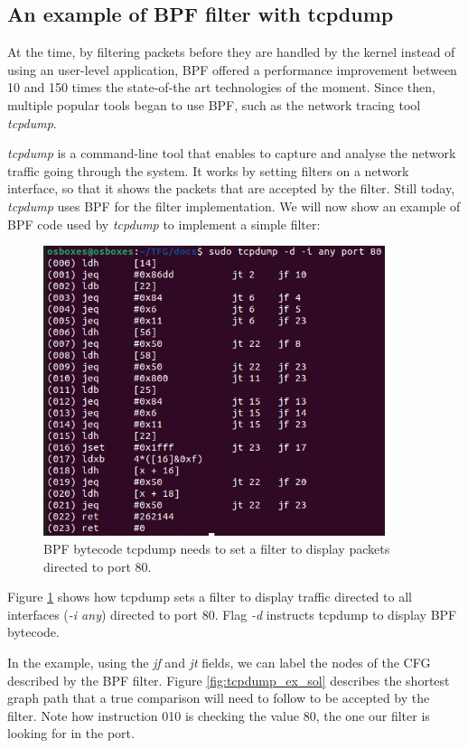 \documentclass[12pt]{report} %
\begin{document}
\subsection{An example of BPF filter with tcpdump}
At the time, by filtering packets before they are handled by the kernel instead of using an user-level application, BPF offered a performance improvement between 10 and 150 times the state-of-the art technologies of the moment\cite{bpf_bsd_origin_bpf_page1}. Since then, multiple popular tools began to use BPF, such as the network tracing tool \textit{tcpdump}\cite{tcpdump_page}.

\textit{tcpdump} is a command-line tool that enables to capture and analyse the network traffic going through the system. It works by setting filters on a network interface, so that it shows the packets that are accepted by the filter. Still today, \textit{tcpdump} uses BPF for the filter implementation. We will now show an example of BPF code used by \textit{tcpdump} to implement a simple filter:

\begin{figure}[H]
	\centering
	\includegraphics[width=10cm]{tcpdump_example.png}
	\caption{BPF bytecode tcpdump needs to set a filter to display packets directed to port 80.}
	\label{fig:bpf_tcpdump_example}
\end{figure}

Figure \ref{fig:bpf_tcpdump_example} shows how tcpdump sets a filter to display traffic directed to all interfaces (\textit{-i any}) directed to port 80. Flag \textit{-d} instructs tcpdump to display BPF bytecode.

In the example, using the \textit{jf} and \textit{jt} fields, we can label the nodes of the CFG described by the BPF filter. Figure \ref{fig:tcpdump_ex_sol} describes the shortest graph path that a true comparison will need to follow to be accepted by the filter. Note how instruction 010 is checking the value 80, the one our filter is looking for in the port.
\end{document}

